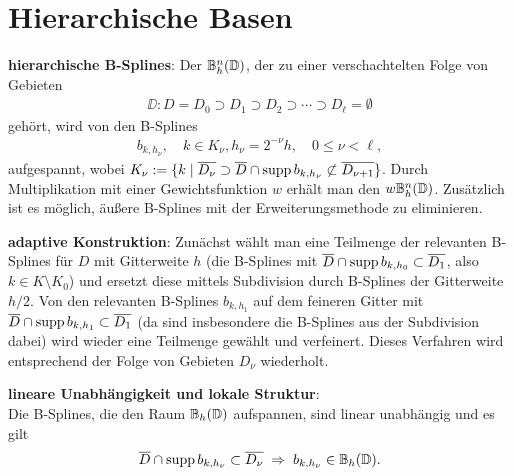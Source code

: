 \section{%
    Hierarchische Basen%
}

\textbf{hierarchische B-Splines}:
Der  $\mathbb{B}_h^n(\mathbb{D})$,
der zu einer verschachtelten Folge von Gebieten
\begin{align*}
    \DD\colon D = D_0 \supset D_1 \supset D_2 \supset \dotsb \supset D_\ell = \emptyset
\end{align*}
gehört, wird von den B-Splines
\begin{align*}
    b_{k,h_\nu},\quad
    k \in K_\nu, h_\nu = 2^{-\nu} h,\quad
    0 \le \nu < \ell,
\end{align*}
aufgespannt, wobei $K_\nu := \{k \;|\; \overline{D_\nu} \supset
\overline{D} \cap \operatorname{supp} b_{k,h_\nu} \not\subset \overline{D_{\nu+1}}\}$.
Durch Multiplikation mit einer Gewichtsfunktion $w$ erhält man den
 $w\mathbb{B}_h^n(\mathbb{D})$.
Zusätzlich ist es möglich, äußere B-Splines mit der Erweiterungsmethode zu eliminieren.

\textbf{adaptive Konstruktion}:
Zunächst wählt man eine Teilmenge der relevanten B-Splines für $D$ mit Gitterweite $h$
(die B-Splines mit $\overline{D} \cap \operatorname{supp} b_{k,h_0} \subset \overline{D_1}$, also
$k \in K \setminus K_0$)
und ersetzt diese mittels Subdivision durch B-Splines der Gitterweite $h/2$.
Von den relevanten B-Splines $b_{k,h_1}$ auf dem feineren Gitter mit
$\overline{D} \cap \operatorname{supp} b_{k,h_1} \subset \overline{D_1}$
(da sind insbesondere die B-Splines aus der Subdivision dabei) wird wieder eine Teilmenge
gewählt und verfeinert.
Dieses Verfahren wird entsprechend der Folge von Gebieten $D_\nu$ wiederholt.

\textbf{lineare Unabhängigkeit und lokale Struktur}:\\
Die B-Splines, die den Raum $\mathbb{B}_h(\mathbb{D})$ aufspannen, sind linear unabhängig und es gilt
\begin{align*}
    \overline{D} \cap \operatorname{supp} b_{k,h_\nu} \subset \overline{D_\nu}
    \;\Rightarrow\; b_{k,h_\nu} \in \mathbb{B}_h(\mathbb{D}).
\end{align*}

\pagebreak
